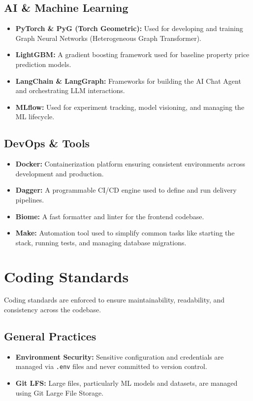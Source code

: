 \subsection{AI \& Machine Learning}
\begin{itemize}
    \item \textbf{PyTorch \& PyG (Torch Geometric):} Used for developing and training Graph Neural Networks (Heterogeneous Graph Transformer).
    \item \textbf{LightGBM:} A gradient boosting framework used for baseline property price prediction models.
    \item \textbf{LangChain \& LangGraph:} Frameworks for building the AI Chat Agent and orchestrating LLM interactions.
    \item \textbf{MLflow:} Used for experiment tracking, model visioning, and managing the ML lifecycle.
\end{itemize}

\subsection{DevOps \& Tools}
\begin{itemize}
    \item \textbf{Docker:} Containerization platform ensuring consistent environments across development and production.
    \item \textbf{Dagger:} A programmable CI/CD engine used to define and run delivery pipelines.
    \item \textbf{Biome:} A fast formatter and linter for the frontend codebase.
    \item \textbf{Make:} Automation tool used to simplify common tasks like starting the stack, running tests, and managing database migrations.
\end{itemize}

\section{Coding Standards}

Coding standards are enforced to ensure maintainability, readability, and consistency across the codebase.

\subsection{General Practices}
\begin{itemize}
    \item \textbf{Environment Security:} Sensitive configuration and credentials are managed via \texttt{.env} files and never committed to version control.
    \item \textbf{Git LFS:} Large files, particularly ML models and datasets, are managed using Git Large File Storage.
\end{itemize}

